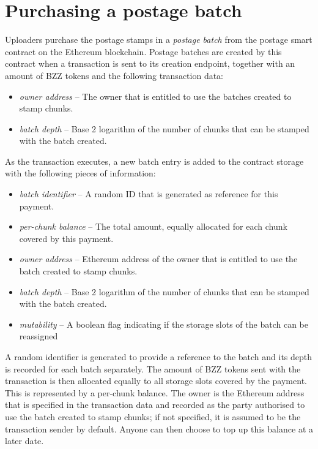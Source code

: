 \section{Purchasing a postage batch}

Uploaders purchase the postage stamps in  a  \emph{postage batch} from the postage smart contract on the Ethereum blockchain. Postage batches are created by this contract when a transaction is sent to its creation endpoint, together with an amount of BZZ tokens and the following transaction data:

\begin{itemize}[noitemsep]
\item \emph{owner address} -- The owner that is entitled to use the batches created to stamp chunks.
\item \emph{batch depth} -- Base 2 logarithm of the number of chunks that can be stamped with the batch created.
\end{itemize}

As the transaction executes, a new batch entry is added to the contract storage with the following pieces of information:

\begin{itemize}[noitemsep]
\item \emph{batch identifier} -- A random ID that is generated as reference for this payment.
\item \emph{per-chunk balance} -- The total amount, equally allocated for each chunk covered by this payment.
\item \emph{owner address} -- Ethereum address of the owner that is entitled to use the batch created to stamp chunks.
\item \emph{batch depth} -- Base 2 logarithm of the number of chunks that can be stamped with the batch created.
\item \emph{mutability} -- A boolean flag indicating if the storage slots of the batch can be reassigned 
\end{itemize}


A random identifier is generated to provide a reference to the batch and its depth is recorded for each batch separately. The amount of BZZ tokens sent with the transaction is then allocated equally to all storage slots covered by the payment. This is represented by a per-chunk balance. 
The owner is the Ethereum address that is specified in the transaction data and recorded as the party authorised to use the batch created to stamp chunks; if not specified, it is assumed to be the transaction sender by default. 
Anyone can then choose to top up this balance at a later date. 


